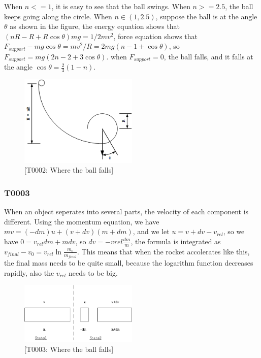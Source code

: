 \documentclass[UTF8]{article}
\begin{document}
When $n<=1$, it is easy to see that the ball swings. When $n>=2.5$, the ball keeps going along the circle. When $n \in (1,2.5)$, suppose the ball is at the angle $\theta$ as shown in the figure, the energy equation shows that $(nR-R + R \cos \theta) mg = 1/2 mv^2$, force equation shows that $F_{support} - mg \cos \theta = m v^2/R = 2mg(n-1+\cos \theta )$, so $F_{support}  = mg(2n-2+ 3\cos \theta )$. when $F_{support}  = 0$, the ball falls, and it falls at the angle $ \cos \theta = \frac{2}{3}(1-n)$.
\begin{figure}[h]
    \centering
    \includegraphics[width=0.5\textwidth]{../../resources/T0002.png}
    \caption{[T0002: Where the ball falls]}
    \label{fig:2}
\end{figure}

\subsubsection{T0003}
When an object seperates into several parts, the velocity of each component is different. Using the momentum equation, we have $mv = (-dm)u+(v+dv)(m+dm)$, and we let $u = v+dv-v_{rel}$, so we have $0 = v_{rel} dm + m dv$, so $dv = -v{rel} \frac{dm}{m}$, the formula is integrated as $v_{final} - v_{0} = v_{rel} \ln \frac{m_0}{m_{final}}$. This means that when the rocket accolerates like this, the final mass needs to be quite small, because the logarithm function decreases rapidly, also the $v_{rel}$ needs to be big.

\begin{figure}[h]
    \centering
    \includegraphics[width=0.5\textwidth]{../../resources/T0003.png}
    \caption{[T0003: Where the ball falls]}
    \label{fig:3}
\end{figure}
\end{document}
